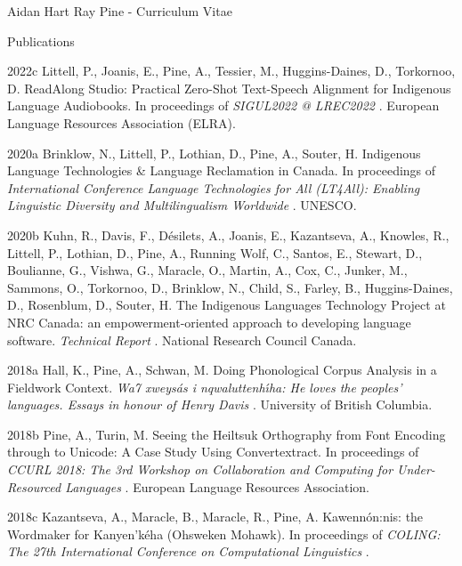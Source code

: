 \documentclass[12pt]{letter}
\begin{document}
\begin{cv}{ Aidan Hart Ray Pine  \space - \space   Curriculum Vitae}
\begin{cvlist}{Publications}
                                                                                \item[2022c] Littell, P., Joanis, E., Pine, A., Tessier, M., Huggins-Daines, D., Torkornoo, D.  ReadAlong Studio: Practical Zero-Shot Text-Speech Alignment for Indigenous Language Audiobooks. In proceedings of \textit{ SIGUL2022 @ LREC2022 }.  European Language Resources Association (ELRA).  
                                                                                                            \item[2020a] Brinklow, N., Littell, P., Lothian, D., Pine, A., Souter, H.  Indigenous Language Technologies \& Language Reclamation in Canada. In proceedings of \textit{ International Conference Language Technologies for All (LT4All): Enabling Linguistic Diversity and Multilingualism Worldwide }.  UNESCO.  
                                                                                \item[2020b]  Kuhn,  R.,  Davis,  F.,  D{\'e}silets,  A.,  Joanis,  E.,  Kazantseva,  A.,  Knowles,  R.,  Littell,  P.,  Lothian,  D.,  Pine,  A.,  Running Wolf,  C.,  Santos,  E.,  Stewart,  D.,  Boulianne,  G.,  Vishwa,  G.,  Maracle,  O.,  Martin,  A.,  Cox,  C.,  Junker,  M.,  Sammons,  O.,  Torkornoo,  D.,  Brinklow,  N.,  Child,  S.,  Farley,  B.,  Huggins-Daines,  D.,  Rosenblum,  D.,  Souter,  H.  The Indigenous Languages Technology Project at NRC Canada: an empowerment-oriented approach to developing language software. \textit{ Technical Report }.  National Research Council Canada.  
                                                                                                                                                                            \item[2018a]  Hall,  K.,  Pine,  A.,  Schwan,  M.  Doing Phonological Corpus Analysis in a Fieldwork Context. \textit{ Wa7 xweys{\'a}s i nqwaluttenh{\'\i}ha: He loves the peoples' languages. Essays in honour of Henry Davis }.  University of British Columbia.  
                                                                                \item[2018b] Pine, A., Turin, M.  Seeing the Heiltsuk Orthography from Font Encoding through to Unicode: A Case Study Using Convertextract. In proceedings of \textit{ CCURL 2018: The 3rd Workshop on Collaboration and Computing for Under-Resourced Languages }.  European Language Resources Association.  
                                                                                \item[2018c] Kazantseva, A., Maracle, B., Maracle, R., Pine, A.  Kawenn{\'o}n:nis: the Wordmaker for Kanyen'k{\'e}ha (Ohsweken Mohawk). In proceedings of \textit{ COLING: The 27th International Conference on Computational Linguistics }.  

\end{cvlist}
\end{cv}
\end{document}
